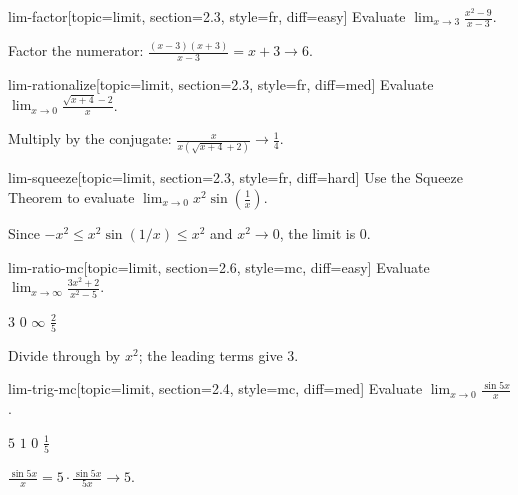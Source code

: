 
\begin{problem}{lim-factor}[topic=limit, section=2.3, style=fr, diff=easy]
	Evaluate $\displaystyle \lim_{x \to 3} \frac{x^2 - 9}{x - 3}$.
	\begin{solution}
	Factor the numerator: $\frac{(x-3)(x+3)}{x-3} = x + 3 \to 6$.
	\end{solution}
\end{problem}

\begin{problem}{lim-rationalize}[topic=limit, section=2.3, style=fr, diff=med]
	Evaluate $\displaystyle \lim_{x \to 0} \frac{\sqrt{x+4}-2}{x}$.
	\begin{solution}
	Multiply by the conjugate: $\frac{x}{x(\sqrt{x+4}+2)} \to \frac{1}{4}$.
	\end{solution}
\end{problem}

\begin{problem}{lim-squeeze}[topic=limit, section=2.3, style=fr, diff=hard]
	Use the Squeeze Theorem to evaluate
	$\displaystyle \lim_{x \to 0} x^2 \sin\!\left(\frac{1}{x}\right)$.
	\begin{solution}
	Since $-x^2 \le x^2 \sin(1/x) \le x^2$ and $x^2 \to 0$, the limit is $0$.
	\end{solution}
\end{problem}

\begin{problem}{lim-ratio-mc}[topic=limit, section=2.6, style=mc, diff=easy]
	Evaluate $\displaystyle \lim_{x \to \infty} \frac{3x^2 + 2}{x^2 - 5}$.
	\begin{choices}
		\cchoice $3$
		\choice $0$
		\choice $\infty$
		\choice $\tfrac{2}{5}$
	\end{choices}
	\begin{solution} Divide through by $x^2$; the leading terms give $3$. \end{solution}
\end{problem}

\begin{problem}{lim-trig-mc}[topic=limit, section=2.4, style=mc, diff=med]
	Evaluate $\displaystyle \lim_{x \to 0} \frac{\sin 5x}{x}$.
	\begin{choices}
		\cchoice $5$
		\choice $1$
		\choice $0$
		\choice $\tfrac{1}{5}$
	\end{choices}
	\begin{solution} $\frac{\sin 5x}{x} = 5\cdot\frac{\sin 5x}{5x} \to 5$. \end{solution}
\end{problem}

